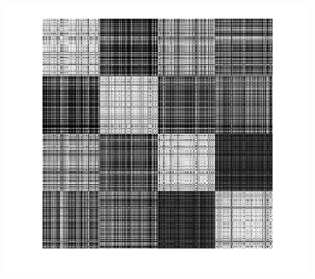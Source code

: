 \documentclass{article}
\begin{document}
\begin{center}
\includegraphics[scale=1]{Classification/1c/c_g/kgm}
\end{center}
\end{document}
